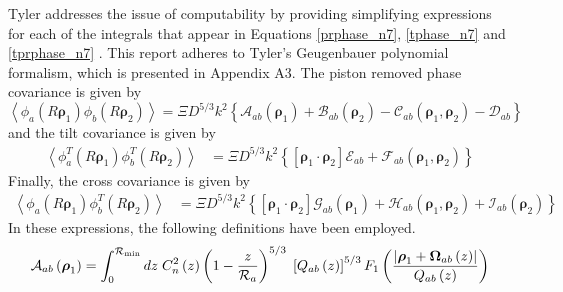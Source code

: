 Tyler addresses the issue of computability by providing simplifying
expressions for each of the integrals that appear in Equations
\ref{prphase_n7}, \ref{tphase_n7} and \ref{tprphase_n7} .  This report
adheres to Tyler's Geugenbauer polynomial formalism, which is
presented in Appendix A3\cite{1994JOSAA..11..409T}.  The piston
removed phase covariance is given by
\begin{equation}\label{phasecovariance}
\left\langle \phi_{a}\left(R\boldsymbol{\rho}_{1}\right)  \phi_{b}\left(R\boldsymbol{\rho}_{2}\right)\right\rangle = 
\Xi D^{5/3} k^{2} \left\{
\mathcal{A}_{ab}\left(\boldsymbol{\rho}_{1}\right) + 
\mathcal{B}_{ab}\left(\boldsymbol{\rho}_{2}\right) - 
\mathcal{C}_{ab}\left(\boldsymbol{\rho}_{1},\boldsymbol{\rho}_{2}\right) - 
\mathcal{D}_{ab}\right\}
\end{equation}
and the tilt covariance is given by
\begin{equation}\label{tiltcovariance}
\begin{split}
\left\langle \phi^{T}_{a}\left(R\boldsymbol{\rho}_{1}\right)  \phi^{T}_{b}\left(R\boldsymbol{\rho}_{2}\right)\right\rangle & = 
\Xi D^{5/3} k^{2} \left\{
\left[\boldsymbol{\rho}_{1} \cdot \boldsymbol{\rho}_{2} \right] \mathcal{E}_{ab} + 
\mathcal{F}_{ab}\left(\boldsymbol{\rho}_{1}, \boldsymbol{\rho}_{2}\right)
\right\} 
\end{split}
\end{equation}
Finally, the cross covariance is given by
\begin{equation}\label{crosscovariance}
\begin{split}
\left\langle \phi_{a}\left(R\boldsymbol{\rho}_{1}\right)  \phi^{T}_{b}\left(R\boldsymbol{\rho}_{2}\right)\right\rangle & = 
\Xi D^{5/3} k^{2} \left\{
\left[\boldsymbol{\rho}_{1} \cdot \boldsymbol{\rho}_{2} \right] \mathcal{G}_{ab}\left(\boldsymbol{\rho}_{1}\right) + 
\mathcal{H}_{ab}\left(\boldsymbol{\rho}_{1}, \boldsymbol{\rho}_{2}\right) + 
\mathcal{I}_{ab}\left(\boldsymbol{\rho}_{2}\right)
\right\} 
\end{split}
\end{equation}
In these expressions, the following definitions have been employed.
\begin{equation}\label{caliph_A}
\mathcal{A}_{ab}\left(\boldsymbol{\rho}_{1}\right) = 
\int_{0}^{\mathcal{R}_{\rm min}} dz \; C_{n}^{2}\left(z\right) \left( 1 - \frac{z}{\mathcal{R}_{a}}\right)^{5/3}\; 
\left[Q_{ab}\left(z\right)\right]^{5/3} 
F_{1}\left(\frac{\left\vert\boldsymbol{\rho}_{1} + \boldsymbol{\Omega}_{ab}\left(z\right)\right\vert}{Q_{ab}\left(z\right)}\right)
\end{equation}
